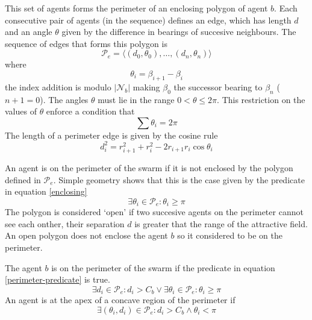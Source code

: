 \documentclass{ieeeaccess}
\begin{document}
This set of agents forms the perimeter of an enclosing polygon of agent $b$. 
Each consecutive pair of agents (in the sequence) defines an edge, which has
length $d$ and an angle $\theta$ given by the difference in bearings of
succesive neighbours.  The sequence of edges
that forms this polygon is
\begin{equation}
	\mathcal{P}_e = \langle (d_0,\theta_0), \ldots , (d_n,\theta_n) \rangle
\end{equation}
where
\begin{equation}
	\theta_i = \beta_{i+1} - \beta_i
\end{equation}
the index addition is modulo $|\mathcal N_b|$ making $\beta_0$ the successor
bearing to $\beta_n$ ($n+1 = 0$).  The angles $\theta$ must lie in the range
$0<\theta\leq2\pi$.
This restriction on the values of $\theta$ enforce a condition that
\begin{equation}
	\sum\theta_i = 2\pi
\end{equation}
The length of a perimeter edge is given by the cosine rule
\begin{equation}
	d_i^2 = r_{i+1}^2 + r_i^2 -2r_{i+1}r_i \cos\theta_i
\end{equation}

An agent is on the perimeter of the swarm if it is not enclosed by the polygon
defined in $\mathcal{P}_e$.  Simple geometry shows that this is the case given
by the predicate in equation \ref{enclosing}
\begin{equation}
	\exists \theta_i \in \mathcal{P}_e : \theta_i\geq\pi
	\label{enclosing}
\end{equation}
The polygon is considered `open' if two succesive agents on the perimeter 
cannot see each onther, their separation $d$ is greater that the range of the
attractive field.  An open polygon does not enclose the agent $b$ so it
considered to be on the perimeter.

The agent $b$ is on the perimeter of the swarm if the predicate in equation
\ref{perimeter-predicate} is true.
\begin{equation}
	\exists d_i\in\mathcal{P}_e:d_i>C_b \vee
	\exists\theta_i\in\mathcal{P}_e:\theta_i\geq\pi
	\label{perimeter-predicate}
\end{equation}
An agent is at the apex of a concave region of the perimeter if
\begin{equation}
	\exists(\theta_i,d_i)\in\mathcal{P}_e : d_i>C_b\wedge\theta_i<\pi
	\label{concave-predicate}
\end{equation}
\end{document}
